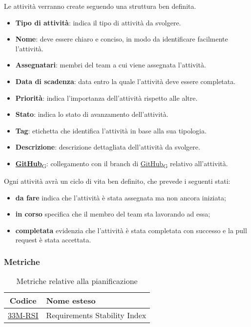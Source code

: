 Le attività verranno create seguendo una struttura ben definita.
\begin{itemize}
    \item \textbf{Tipo di attività}: indica il tipo di attività da svolgere.
    \item \textbf{Nome}: deve essere chiaro e conciso, in modo da identificare facilmente l'attività.
    \item \textbf{Assegnatari}: membri del team a cui viene assegnata l'attività.
    \item \textbf{Data di scadenza}: data entro la quale l'attività deve essere completata.
    \item \textbf{Priorità}: indica l'importanza dell'attività rispetto alle altre.
    \item \textbf{Stato}: indica lo stato di avanzamento dell'attività.
    \item \textbf{Tag}: etichetta che identifica l'attività in base alla sua tipologia.
    \item \textbf{Descrizione}: descrizione dettagliata dell'attività da svolgere.
    \item \href{https://7last.github.io/docs/rtb/documentazione-interna/glossario\#github}{\textbf{GitHub}\textsubscript{G}}: collegamento con il branch di \href{https://7last.github.io/docs/rtb/documentazione-interna/glossario\#github}{GitHub\textsubscript{G}} relativo all'attività.
\end{itemize}
Ogni attività avrà un ciclo di vita ben definito, che prevede i seguenti stati:
\begin{itemize}
    \item \textbf{da fare} indica che l'attività è stata assegnata ma non ancora iniziata;
    \item \textbf{in corso} specifica che il membro del team sta lavorando ad essa;
    \item \textbf{completata} evidenzia che l'attività è stata completata con successo e la pull request è stata accettata.
\end{itemize}

\subsubsection{Metriche}
\begin{table}[!h]
	\centering
	\begin{tabular}{ | c | l | }
		\hline
		\textbf{Codice}                      & \textbf{Nome esteso}         \\
		\hline
        \underline{\hyperlink{33M}{33M-RSI}} & Requirements Stability Index \\
		\hline
	\end{tabular}
	\caption{Metriche relative alla pianificazione}
\end{table}

